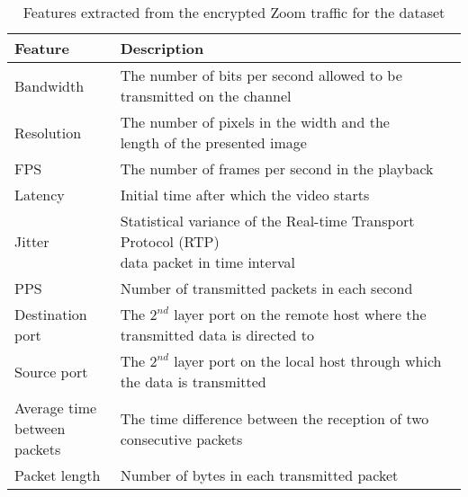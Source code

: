 \begin{table*}
    \caption{Features extracted from the encrypted Zoom traffic for the dataset}
    \centering
        \begin{tabular}{l|l}
            Feature & Description \\        
            \hline
            Bandwidth & \makecell[l]{The number of bits per second allowed to be\\transmitted on the channel}\\
            Resolution & \makecell[l]{The number of pixels in the width and the\\length of the presented image}\\
            FPS & The number of frames per second in the playback\\
            Latency & Initial time after which the video starts\\
            Jitter & \makecell[l]{Statistical variance of the Real-time Transport Protocol (RTP)\cite{schulzrinne2003rfc3550}\\data packet in time interval}\\
            PPS & Number of transmitted packets in each second\\
            Destination port & \makecell[l]{The $2^{nd}$ layer port on the remote host where\\ the transmitted data is directed to}\\
            Source port & \makecell[l]{The $2^{nd}$ layer port on the local host through which\\the data is transmitted}\\
            \makecell[l]{Average time\\between packets} & \makecell[l]{The time difference between the reception of two\\consecutive packets}\\
            Packet length & Number of bytes in each transmitted packet\\
        \end{tabular} 
    \label{tab:zoom-features}
\end{table*}

